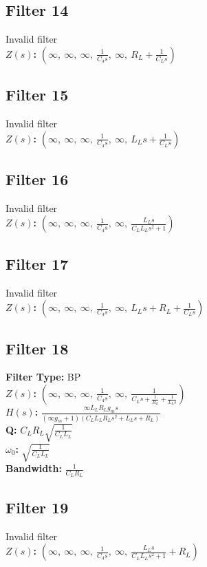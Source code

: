 \documentclass{article}
\begin{document}
\subsection*{Filter 14}
Invalid filter \\ 
\textbf{$Z(s)$:} $\left( \infty, \  \infty, \  \infty, \  \frac{1}{C_{4} s}, \  \infty, \  R_{L} + \frac{1}{C_{L} s}\right)$ \\ 
\subsection*{Filter 15}
Invalid filter \\ 
\textbf{$Z(s)$:} $\left( \infty, \  \infty, \  \infty, \  \frac{1}{C_{4} s}, \  \infty, \  L_{L} s + \frac{1}{C_{L} s}\right)$ \\ 
\subsection*{Filter 16}
Invalid filter \\ 
\textbf{$Z(s)$:} $\left( \infty, \  \infty, \  \infty, \  \frac{1}{C_{4} s}, \  \infty, \  \frac{L_{L} s}{C_{L} L_{L} s^{2} + 1}\right)$ \\ 
\subsection*{Filter 17}
Invalid filter \\ 
\textbf{$Z(s)$:} $\left( \infty, \  \infty, \  \infty, \  \frac{1}{C_{4} s}, \  \infty, \  L_{L} s + R_{L} + \frac{1}{C_{L} s}\right)$ \\ 
\subsection*{Filter 18}
\textbf{Filter Type:} BP \\ 
\textbf{$Z(s)$:} $\left( \infty, \  \infty, \  \infty, \  \frac{1}{C_{4} s}, \  \infty, \  \frac{1}{C_{L} s + \frac{1}{R_{L}} + \frac{1}{L_{L} s}}\right)$ \\ 
\textbf{$H(s)$:} $\frac{\infty L_{L} R_{L} g_{m} s}{\left(\infty g_{m} + 1\right) \left(C_{L} L_{L} R_{L} s^{2} + L_{L} s + R_{L}\right)}$ \\ 
\textbf{Q:} $C_{L} R_{L} \sqrt{\frac{1}{C_{L} L_{L}}}$ \\ 
\textbf{$\omega_0$:} $\sqrt{\frac{1}{C_{L} L_{L}}}$ \\ 
\textbf{Bandwidth:} $\frac{1}{C_{L} R_{L}}$ \\ 
\subsection*{Filter 19}
Invalid filter \\ 
\textbf{$Z(s)$:} $\left( \infty, \  \infty, \  \infty, \  \frac{1}{C_{4} s}, \  \infty, \  \frac{L_{L} s}{C_{L} L_{L} s^{2} + 1} + R_{L}\right)$ \\ 
\end{document}
